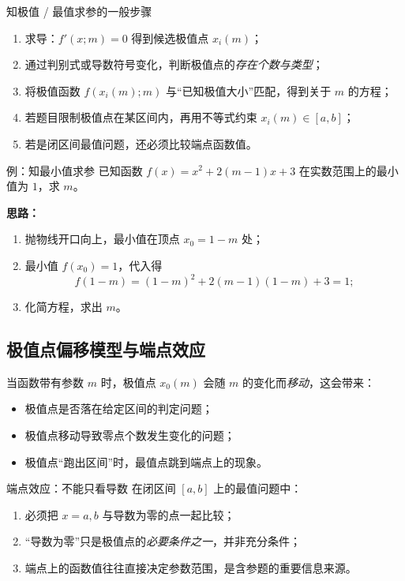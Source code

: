\documentclass[a4paper,11pt]{ctexart}
\begin{document}
\begin{summarybox}{知极值 / 最值求参的一般步骤}
  \begin{enumerate}
    \item 求导：$f'(x;m)=0$ 得到候选极值点 $x_i(m)$；
    \item 通过判别式或导数符号变化，判断极值点的\emph{存在个数与类型}；
    \item 将极值函数 $f(x_i(m);m)$ 与“已知极值大小”匹配，得到关于 $m$ 的方程；
    \item 若题目限制极值点在某区间内，再用不等式约束 $x_i(m)\in[a,b]$；
    \item 若是闭区间最值问题，还必须比较端点函数值。
  \end{enumerate}
\end{summarybox}

\begin{examplebox}[mathnote coverage=soft]{例：知最小值求参}
  已知函数 $f(x)=x^2+2(m-1)x+3$ 在实数范围上的最小值为 $1$，求 $m$。
\end{examplebox}

\textbf{思路：}
\begin{enumerate}
  \item 抛物线开口向上，最小值在顶点 $x_0=1-m$ 处；
  \item 最小值 $f(x_0)=1$，代入得
  \[
    f(1-m)=(1-m)^2+2(m-1)(1-m)+3=1;
  \]
  \item 化简方程，求出 $m$。
\end{enumerate}

\subsection{极值点偏移模型与端点效应}

当函数带有参数 $m$ 时，极值点 $x_0(m)$ 会随 $m$ 的变化而\emph{移动}，这会带来：
\begin{itemize}
  \item 极值点是否落在给定区间的判定问题；
  \item 极值点移动导致零点个数发生变化的问题；
  \item 极值点“跑出区间”时，最值点跳到端点上的现象。
\end{itemize}

\begin{warningbox}[mathnote coverage=soft]{端点效应：不能只看导数}
  在闭区间 $[a,b]$ 上的最值问题中：
  \begin{enumerate}
    \item 必须把 $x=a,b$ 与导数为零的点一起比较；
    \item “导数为零”只是极值点的\emph{必要条件之一}，并非充分条件；
    \item 端点上的函数值往往直接决定参数范围，是含参题的重要信息来源。
  \end{enumerate}
\end{warningbox}
\end{document}
